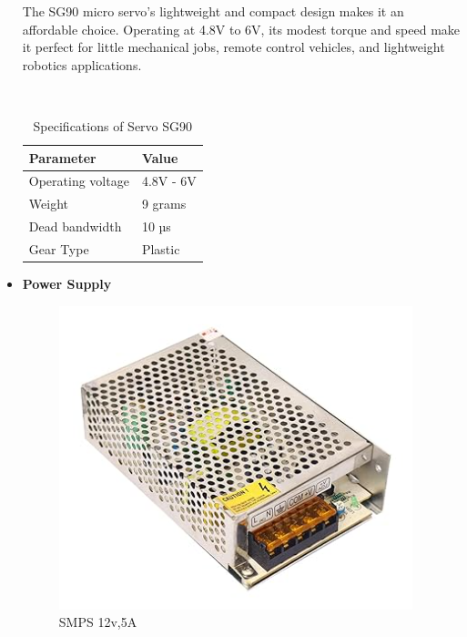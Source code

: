 \documentclass[12pt,a4paper]{report}
\begin{document}
\begin{itemize}
\par The SG90 micro servo's lightweight and compact design makes it an affordable choice. Operating at 4.8V to 6V, its modest torque and speed make it perfect for little mechanical jobs, remote control vehicles, and lightweight robotics applications.

\begin{table}[H]
\begin{center}
\caption{Specifications of Servo SG90}%
\hspace*{0.2in}
\\
\begin{tabular}{| p{5cm} | p{5cm} |}
\hline
{\bf{Parameter}}             &{\bf{Value}}           \\ \hline
Operating voltage
& 4.8V - 6V \\ \hline

Weight
& 9 grams \\ \hline

Dead bandwidth
& 10 µs \\ \hline

Gear Type
& Plastic \\ \hline

\end{tabular}
\end{center}
\end{table}

\newpage
\item {\bf{Power Supply}}
\begin{figure}[!htb]
\begin{center}
\includegraphics[scale=0.8]{images/hardware/smps 12v,5a.png}
\caption{SMPS 12v,5A }
\end{center}
\end{figure}


\end{itemize}
\end{document}

